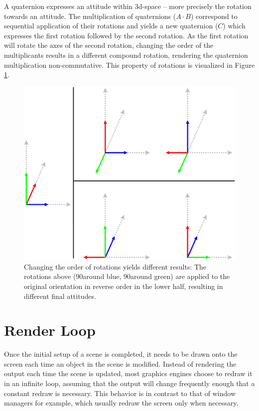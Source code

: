 	A quaternion expresses an attitude within 3d-space -- more precisely the rotation towards an attitude. The multiplication of quaternions ($A \cdot B$) correspond to sequential application of their rotations and yields a new quaternion ($C$) which expresses the first rotation followed by the second rotation. As the first rotation will rotate the axes of the second rotation, changing the order of the multiplicants results in a different compound rotation, rendering the quaternion multiplication non-commutative. This property of rotations is visualized in Figure \ref{fig:Rotations}.

	\begin{figure}[htbp]
		\centering
		\includegraphics[width=14cm]{images/rotation.png}
		\caption{Changing the order of rotations yields different results: The rotations above (90\degree around blue, 90\degree around green) are applied to the original orientation in reverse order in the lower half, resulting in different final attitudes.}
		\label{fig:Rotations}
	\end{figure}

\section{Render Loop}

	Once the initial setup of a scene is completed, it needs to be drawn onto the screen each time an object in the scene is modified. Instead of rendering the output each time the scene is updated, most graphics engines choose to redraw it in an infinite loop, assuming that the output will change frequently enough that a constant redraw is necessary. This behavior is in contrast to that of window managers for example, which usually redraw the screen only when necessary.

